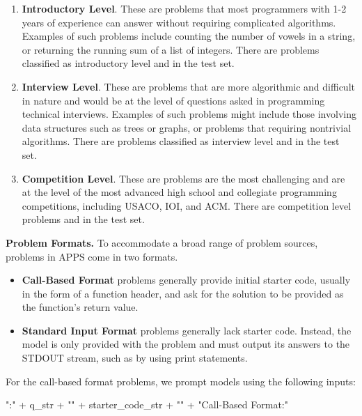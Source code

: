 \documentclass{article}
\begin{document}
\begin{enumerate}
    \item \textbf{Introductory Level}. These are problems that most programmers with 1-2 years of experience can answer without requiring complicated algorithms. Examples of such problems include counting the number of vowels in a string, or returning the running sum of a list of integers. There are  problems classified as introductory level and  in the test set.
    \item \textbf{Interview Level}. These are problems that are more algorithmic and difficult in nature and would be at the level of questions asked in programming technical interviews. Examples of such problems might include those involving data structures such as trees or graphs, or problems that requiring nontrivial algorithms. There are  problems classified as interview level and  in the test set.
    \item \textbf{Competition Level}. These are problems are the most challenging and are at the level of the most advanced high school and collegiate programming competitions, including USACO, IOI, and ACM. There are  competition level problems and  in the test set.
\end{enumerate}








\noindent\textbf{Problem Formats.}\quad 
To accommodate a broad range of problem sources, problems in APPS come in two formats.
\begin{itemize}
    \item \textbf{Call-Based Format} problems generally provide initial starter code, usually in the form of a function header, and ask for the solution to be provided as the function's return value.
    \item \textbf{Standard Input Format} problems generally lack starter code. Instead, the model is only provided with the problem and must output its answers to the STDOUT stream, such as by using print statements.
\end{itemize}

For the call-based format problems, we prompt models using the following inputs:

\begin{spverbatim}
"\nQUESTION:\n" + q_str + "\n" + starter_code_str + "\n" + "\nUse Call-Based Format\n\nANSWER:\n"
\end{spverbatim}
\end{document}
